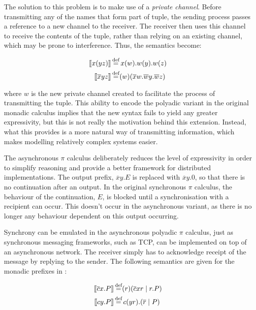 The solution to this problem is to make use of a \emph{private
  channel}.  Before transmitting any of the names that form part of
tuple, the sending process passes a reference to a new channel to the
receiver.  The receiver then uses this channel to receive the contents
of the tuple, rather than relying on an existing channel, which may be
prone to interference.  Thus, the semantics become:

\begin{align}
\seml x(yz) \semr & \eqdef x(w).w(y).w(z) \\
\seml \overline{x}yz \semr & \eqdef (w)(\overline{x}w.\overline{w}y.\overline{w}z)
\end{align}

\noindent where $w$ is the new private channel created to facilitate
the process of transmitting the tuple.  This ability to encode the
polyadic variant in the original monadic calculus implies that the new
syntax fails to yield any greater expressivity, but this is not really
the motivation behind this extension.  Instead, what this provides is
a more natural way of transmitting information, which makes modelling
relatively complex systems easier.

The asynchronous $\pi$ calculus
\cite{boudol:asynchrony,honda:asynchronouscommunication,sangiorgi:asynchronousprocesscalculi}
deliberately reduces the level of expressivity in order to simplify
reasoning and provide a better framework for distributed
implementations.  The output prefix, $\overline{x}y.E$ is replaced
with $\overline{x}y.0$, so that there is no continuation after an
output.  In the original synchronous $\pi$ calculus, the behaviour of
the continuation, $E$, is blocked until a synchronisation with a
recipient can occur.  This doesn't occur in the asynchronous variant,
as there is no longer any behaviour dependent on this output
occurring.

  Synchrony can be emulated in the asynchronous polyadic $\pi$
  calculus, just as synchronous messaging frameworks, such as TCP, can
  be implemented on top of an asynchronous network.  The receiver
  simply has to acknowledge receipt of the message by replying to the
  sender.  The following semantics are given for the monadic prefixes
  in \cite{boxedamb01}:

\begin{align}
\seml \overline{c}x.P \semr & \eqdef (r)(\overline{c}xr\;|\;r.P) \\
\seml cy.P \semr & \eqdef c(yr).(\overline{r}\;|\;P)
\end{align}

